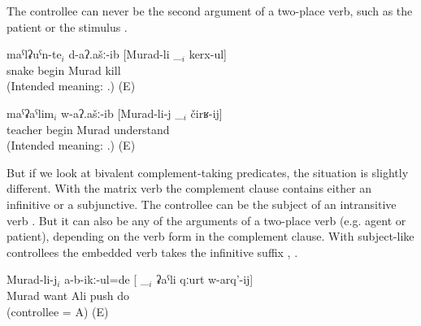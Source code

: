 The controllee can never be the second argument of a two-place verb, such as the patient  or the stimulus . 
%
\begin{exe}
	\ex	\label{ex:Snakes, Murad, teacher ungrammatical@43}
	\begin{xlist}
		\ex	\label{ex:The snakes began to be killed by Murad@43a}
		\gll	{*}	maˁlʡuˁn-te$_{i}$	d-aʔ.ašː-ib	[Murad-li	\_$_{i}$	kerx-ul]\\
			{}	snake	begin	Murad		kill\\
		\glt	(Intended meaning: .) (E)

		\ex	\label{ex:The teacher began to be understood by Murad@43bA}
		\gll	{*}	maˁʡaˁlim$_{i}$	w-aʔ.ašː-ib	[Murad-li-j	\_$_{i}$	čirʁ-ij]\\
			{}	teacher	begin	Murad		understand\\
		\glt	(Intended meaning: .) (E)
	\end{xlist}
\end{exe}

But if we look at bivalent complement-taking predicates, the situation is slightly different. With the matrix verb   the complement clause contains either an infinitive or a subjunctive. The controllee can be the subject of an intransitive verb . But it can also be any of the arguments of a two-place verb (e.g. agent or patient), depending on the verb form in the complement clause. With subject-like controllees the embedded verb takes the infinitive suffix , .
%
\begin{exe}
	\ex	\label{ex:Murad did not want to push Ali@44}
	\gll	Murad-li-j$_{i}$	a-b-ikː-ul=de	[ \_$_{i}$	ʡaˁli	qːurt	w-arq'-ij]\\
		Murad	want	{} 	Ali	push	do\\
	\glt	{} (controllee = A) (E)
\end{exe}

